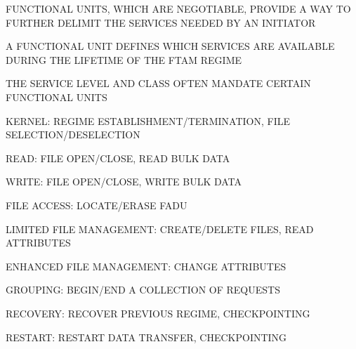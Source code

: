\begin{bwslide}

\begin{nrtc}
\item	FUNCTIONAL UNITS, WHICH ARE NEGOTIABLE, PROVIDE A WAY TO FURTHER
	DELIMIT THE SERVICES NEEDED BY AN INITIATOR

\item	A FUNCTIONAL UNIT DEFINES WHICH SERVICES ARE AVAILABLE DURING
	THE LIFETIME OF THE FTAM REGIME

\item	THE SERVICE LEVEL AND CLASS OFTEN MANDATE CERTAIN FUNCTIONAL UNITS
\end{nrtc}
\end{bwslide}


\begin{bwslide}

\begin{nrtc}
\item	KERNEL: REGIME ESTABLISHMENT/TERMINATION, FILE SELECTION/DESELECTION

\item	READ: FILE OPEN/CLOSE, READ BULK DATA

\item	WRITE: FILE OPEN/CLOSE, WRITE BULK DATA

\item	FILE ACCESS: LOCATE/ERASE FADU

\item	LIMITED FILE MANAGEMENT: CREATE/DELETE FILES, READ ATTRIBUTES

\item	ENHANCED FILE MANAGEMENT: CHANGE ATTRIBUTES

\item	GROUPING: BEGIN/END A COLLECTION OF REQUESTS

\item	RECOVERY: RECOVER PREVIOUS REGIME, CHECKPOINTING

\item	RESTART: RESTART DATA TRANSFER, CHECKPOINTING
\end{nrtc}
\end{bwslide}




